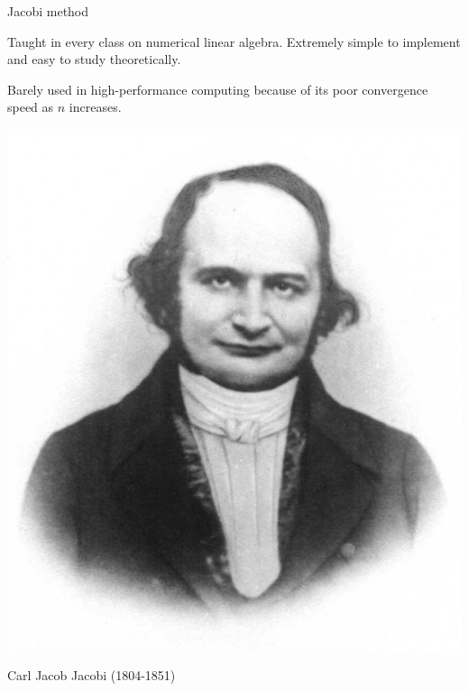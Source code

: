 \documentclass[aspectratio=169]{beamer}
\begin{document}
\begin{frame}[t, c]{Jacobi method}{}
  \begin{minipage}{.68\textwidth}
    \begin{overprint}
      Taught in every class on numerical linear algebra.
      Extremely simple to implement and easy to study theoretically.

      Barely used in high-performance computing because of its poor convergence speed as $n$ increases.
    \end{overprint}
  \end{minipage}%
  \hfill
  \begin{minipage}{.28\textwidth}
    \centering
    \includegraphics[width=\textwidth]{carl_jacobi}

    \small
    Carl Jacob Jacobi (1804-1851)
  \end{minipage}
\end{frame}
\end{document}
